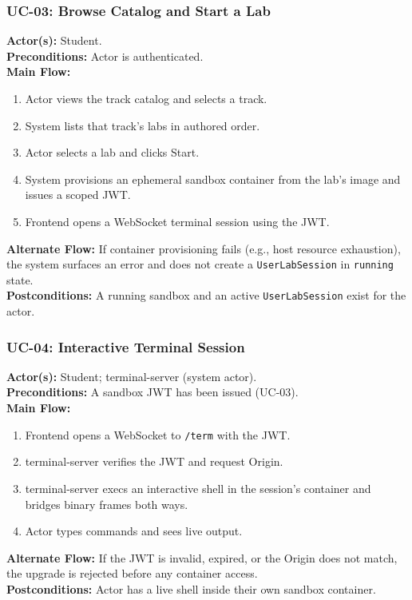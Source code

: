 \documentclass[11pt]{article}
\begin{document}
\subsubsection*{UC-03: Browse Catalog and Start a Lab}
\textbf{Actor(s):} Student.\\
\textbf{Preconditions:} Actor is authenticated.\\
\textbf{Main Flow:}
\begin{enumerate}
\item Actor views the track catalog and selects a track.
\item System lists that track's labs in authored order.
\item Actor selects a lab and clicks Start.
\item System provisions an ephemeral sandbox container from the lab's
      image and issues a scoped JWT.
\item Frontend opens a WebSocket terminal session using the JWT.
\end{enumerate}
\textbf{Alternate Flow:} If container provisioning fails (e.g., host
resource exhaustion), the system surfaces an error and does not create
a \texttt{UserLabSession} in \texttt{running} state.\\
\textbf{Postconditions:} A running sandbox and an active
\texttt{UserLabSession} exist for the actor.

\subsubsection*{UC-04: Interactive Terminal Session}
\textbf{Actor(s):} Student; terminal-server (system actor).\\
\textbf{Preconditions:} A sandbox JWT has been issued (UC-03).\\
\textbf{Main Flow:}
\begin{enumerate}
\item Frontend opens a WebSocket to \texttt{/term} with the JWT.
\item terminal-server verifies the JWT and request Origin.
\item terminal-server execs an interactive shell in the session's
      container and bridges binary frames both ways.
\item Actor types commands and sees live output.
\end{enumerate}
\textbf{Alternate Flow:} If the JWT is invalid, expired, or the Origin
does not match, the upgrade is rejected before any container access.\\
\textbf{Postconditions:} Actor has a live shell inside their own
sandbox container.
\end{document}
